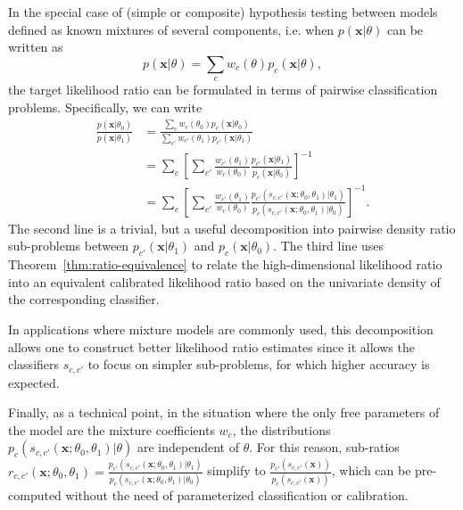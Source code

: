 \documentclass[12pt]{article}
\numberwithin{equation}{section}
\theoremstyle{plain}
\begin{document}
In the special case of (simple or composite) hypothesis testing between
models defined as known mixtures of several components, i.e. when $p(\mathbf{x}|\theta)$ can be written as
\begin{equation}
p(\mathbf{x}|\theta)=\sum_c w_c(\theta) p_c(\mathbf{x}| \theta),
\end{equation}
the target likelihood ratio can be formulated in terms of pairwise
classification problems. Specifically, we can write
\begin{align}
\frac{p(\mathbf{x}|\theta_0)}{p(\mathbf{x}|\theta_1)} &= \frac{\sum_c w_c(\theta_0) p_c(\mathbf{x}| \theta_0)}{\sum_{c'} w_{c'}(\theta_1) p_{c'}(\mathbf{x}| \theta_1)} \nonumber \\
&= \sum_c \left[ \sum_{c'} \frac{ w_{c'}(\theta_1)}{w_c(\theta_0)} \frac{ p_{c'}(\mathbf{x}| \theta_1)}{  p_c(\mathbf{x}| \theta_0)}  \right]^{-1} \nonumber \\
&= \sum_c \left[ \sum_{c'} \frac{ w_{c'}(\theta_1)}{w_c(\theta_0)} \frac{ p_{c'}(s_{c,c'}(\mathbf{x};\theta_0, \theta_1)| \theta_1)}{ p_c(s_{c,c'}(\mathbf{x};\theta_0, \theta_1)| \theta_0)}  \right]^{-1}. \label{eq:decomposedResult}
\end{align}
The second line is a trivial, but a useful decomposition into pairwise
density ratio sub-problems between $p_{c'}(\mathbf{x}|\theta_1)$ and
$p_c(\mathbf{x}|\theta_0)$.  The third line uses
Theorem~\ref{thm:ratio-equivalence} to relate the high-dimensional likelihood
ratio into an equivalent calibrated likelihood ratio based on the univariate
density of the corresponding classifier.

In applications where mixture models are commonly used, this decomposition allows
one to construct better likelihood ratio estimates since it allows the classifiers
$s_{c,c'}$ to focus on simpler sub-problems, for which higher accuracy is
expected.

Finally, as a technical point, in the situation where the only free parameters
of the  model are the mixture coefficients $w_c$, the distributions
$p_{c}(s_{c,c'}(\mathbf{x};\theta_0, \theta_1)| \theta)$ are independent of
$\theta$. For this reason, sub-ratios $r_{c, c'}(\mathbf{x}; \theta_0, \theta_1) = \frac{
p_{c'}(s_{c,c'}(\mathbf{x};\theta_0, \theta_1)|\theta_1)}{
p_c(s_{c,c'}(\mathbf{x};\theta_0, \theta_1)|\theta_0)}$ simplify to $\frac{
p_{c'}(s_{c,c'}(\mathbf{x}))}{ p_c(s_{c,c'}(\mathbf{x}))}$, which can be
pre-computed without the need of parameterized classification or
calibration.
\end{document}

